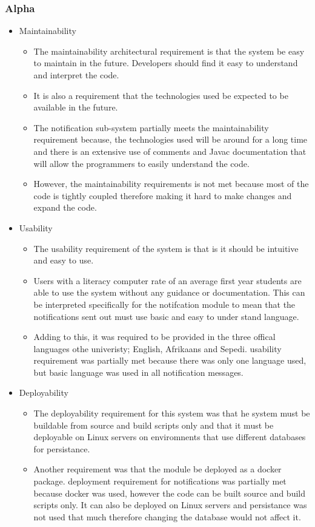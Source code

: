 \subsubsection{Alpha}
\begin{itemize}
	\item Maintainability 
		\begin{itemize}
			\item The maintainability architectural requirement is that the system be easy to maintain in the future. Developers should find it easy to understand and interpret the code.
			\item It is also a requirement that the technologies used be expected to be available in the future.
			\item The notification sub-system partially meets the maintainability requirement because, the technologies used will be around for a long time and there is an extensive use of comments and Javac documentation that will allow the programmers to easily understand the code.
			\item However, the maintainability requirements is not met because most of the code is tightly coupled therefore making it hard to make changes and expand the code.
		\end{itemize}
		\item Usability 
		\begin{itemize}
			\item The usability requirement of the system is that is it should be intuitive and easy to use.
			\item Users with a literacy computer rate of an average first year students are able to use the system without any guidance or documentation. This can be interpreted specifically for the notifcation module to mean that the notifications sent out must use basic and easy to under stand language.
			\item Adding to this, it was required to be provided in the three offical languages othe univeristy; English, Afrikaans and Sepedi.
      \The usability requirement was partially met because there was only one language used, but basic language was used in all notification messages.
    \end{itemize}
    \item Deployability
    \begin{itemize}
      \item The deployability requirement for this system was that he system must be buildable from source and build scripts only and that it must be deployable on Linux servers on enviromnents that use different databases for persistance.
      \item Another requirement was that the module be deployed as a docker package. 
      \The deployment requirement for notifications was partially met because docker was used, however the code can be built source and build scripts only. It can also be deployed on Linux servers and persistance was not used that much therefore changing the database would not affect it.
    \end{itemize}
\end{itemize}
